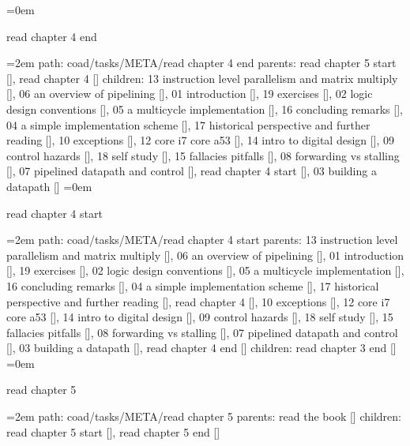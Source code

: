 \smallskip
\leftskip=0em
\par\endgroup
\bigskip
{}
read chapter 4 end
\smallskip
\par\begingroup
\leftskip=2em
path: coad/tasks/META/read chapter 4 end
\smallskip
parents:  read chapter 5 start [], read chapter 4 []
\smallskip
children: 13 instruction level parallelism and matrix multiply [], 06 an overview of pipelining [], 01 introduction [], 19 exercises [], 02 logic design conventions [], 05 a multicycle implementation [], 16 concluding remarks [], 04 a simple implementation scheme [], 17 historical perspective and further reading [], 10 exceptions [], 12 core i7 core a53 [], 14 intro to digital design [], 09 control hazards [], 18 self study [], 15 fallacies pitfalls [], 08 forwarding vs stalling [], 07 pipelined datapath and control [], read chapter 4 start [], 03 building a datapath []
\smallskip
\leftskip=0em
\par\endgroup
\bigskip
{}
read chapter 4 start
\smallskip
\par\begingroup
\leftskip=2em
path: coad/tasks/META/read chapter 4 start
\smallskip
parents:  13 instruction level parallelism and matrix multiply [], 06 an overview of pipelining [], 01 introduction [], 19 exercises [], 02 logic design conventions [], 05 a multicycle implementation [], 16 concluding remarks [], 04 a simple implementation scheme [], 17 historical perspective and further reading [], read chapter 4 [], 10 exceptions [], 12 core i7 core a53 [], 14 intro to digital design [], 09 control hazards [], 18 self study [], 15 fallacies pitfalls [], 08 forwarding vs stalling [], 07 pipelined datapath and control [], 03 building a datapath [], read chapter 4 end []
\smallskip
children: read chapter 3 end []
\smallskip
\leftskip=0em
\par\endgroup
\bigskip
{}
read chapter 5
\smallskip
\par\begingroup
\leftskip=2em
path: coad/tasks/META/read chapter 5
\smallskip
parents:  read the book []
\smallskip
children: read chapter 5 start [], read chapter 5 end []
